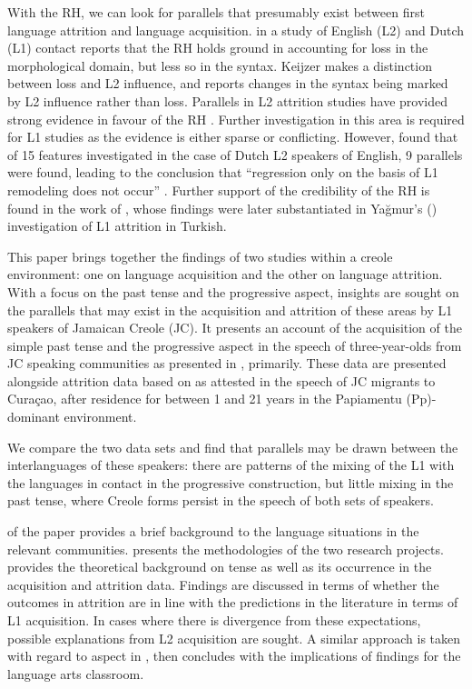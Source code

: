 \documentclass[output=paper,colorlinks,citecolor=brown]{langscibook}
\begin{document}
With the RH, we can look for parallels that presumably exist between first language attrition and language acquisition. \citet{Keijzer2009} in a study of English (L2) and Dutch (L1) contact reports that the RH holds ground in accounting for loss in the morphological domain, but less so in the syntax. Keijzer makes a distinction between loss and L2 influence, and reports changes in the syntax being marked by L2 influence rather than loss.  Parallels in L2 attrition studies have provided strong evidence in favour of the RH \citep[150]{Hansen1999}. Further investigation in this area is required for L1 studies as the evidence is either sparse or conflicting. However, \citet{Keijzer2010} found that of 15 features investigated in the case of Dutch L2 speakers of English, 9 parallels were found, leading to the conclusion that “regression only on the basis of L1 remodeling does not occur” \citep[223--224]{Keijzer2010}. Further support of the credibility of the RH is found in the work of \citet{slobin1977}, whose findings were later substantiated in Yağmur’s (\citeyear{Yağmur1997}) investigation of L1 attrition in Turkish.

This paper brings together the findings of two studies within a creole environment: one on language acquisition and the other on language attrition. With a focus on the past tense and the progressive aspect, insights are sought on the parallels that may exist in the acquisition and attrition of these areas by L1 speakers of Jamaican Creole (JC). It presents an account of the acquisition of the simple past tense and the progressive aspect in the speech of three-year-olds from JC speaking communities as presented in \citet{Kennedy2017}, primarily. These data are presented alongside attrition data based on \citet{Messam-Johnson2017} as attested in the speech of JC migrants to Curaçao, after residence for between 1 and 21 years in the Papiamentu (Pp)-dominant environment.

We compare the two data sets and find that parallels may be drawn between the interlanguages of these speakers: there are patterns of the mixing of the L1 with the languages in contact in the progressive construction, but little mixing in the past tense, where Creole forms persist in the speech of both sets of speakers.

 of the paper provides a brief background to the language situations in the relevant communities.  presents the methodologies of the two research projects.  provides the theoretical background on tense as well as its occurrence in the acquisition and attrition data. Findings are discussed in terms of whether the outcomes in attrition are in line with the predictions in the literature in terms of L1 acquisition. In cases where there is divergence from these expectations, possible explanations from L2 acquisition are sought. A similar approach is taken with regard to aspect in , then  concludes with the implications of findings for the language arts classroom.
\end{document}
